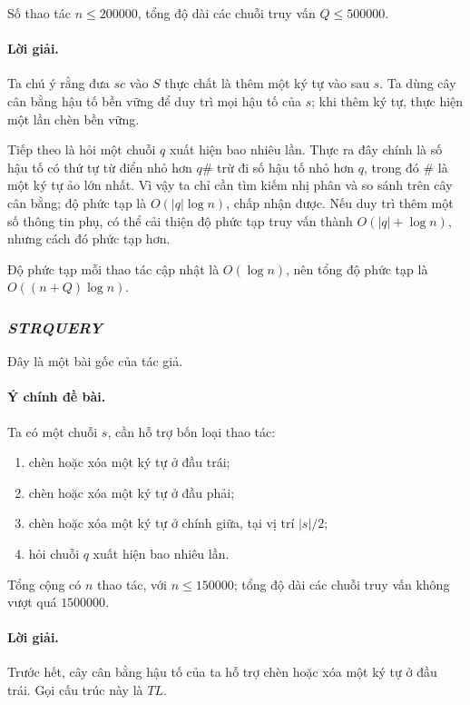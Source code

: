 \documentclass[11pt]{article}
\begin{document}
Số thao tác \(n\le 200000\), tổng độ dài các chuỗi truy vấn \(Q\le 500000\).

\paragraph{Lời giải.}
Ta chú ý rằng đưa \(sc\) vào \(S\) thực chất là thêm một ký tự vào sau
\(s\). Ta dùng cây cân bằng hậu tố bền vững để duy trì mọi hậu tố của \(s\);
khi thêm ký tự, thực hiện một lần chèn bền vững.

Tiếp theo là hỏi một chuỗi \(q\) xuất hiện bao nhiêu lần. Thực ra đây chính
là số hậu tố có thứ tự từ điển nhỏ hơn \(q\#\) trừ đi số hậu tố nhỏ hơn
\(q\), trong đó \(\#\) là một ký tự ảo lớn nhất. Vì vậy ta chỉ cần tìm kiếm
nhị phân và so sánh trên cây cân bằng; độ phức tạp là \(O(|q|\log n)\), chấp
nhận được. Nếu duy trì thêm một số thông tin phụ, có thể cải thiện độ phức
tạp truy vấn thành \(O(|q|+\log n)\), nhưng cách đó phức tạp hơn.

Độ phức tạp mỗi thao tác cập nhật là \(O(\log n)\), nên tổng độ phức tạp là
\(O((n+Q)\log n)\).

\subsubsection{\emph{STRQUERY}}

Đây là một bài gốc của tác giả.

\paragraph{Ý chính đề bài.}
Ta có một chuỗi \(s\), cần hỗ trợ bốn loại thao tác:
\begin{enumerate}
  \item chèn hoặc xóa một ký tự ở đầu trái;
  \item chèn hoặc xóa một ký tự ở đầu phải;
  \item chèn hoặc xóa một ký tự ở chính giữa, tại vị trí \(|s|/2\);
  \item hỏi chuỗi \(q\) xuất hiện bao nhiêu lần.
\end{enumerate}

Tổng cộng có \(n\) thao tác, với \(n\le 150000\); tổng độ dài các chuỗi truy
vấn không vượt quá \(1500000\).

\paragraph{Lời giải.}
Trước hết, cây cân bằng hậu tố của ta hỗ trợ chèn hoặc xóa một ký tự ở đầu
trái. Gọi cấu trúc này là \(TL\).
\end{document}
